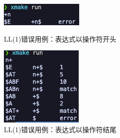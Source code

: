 \begin{figure}[htbp]
    \centering
    \begin{minipage}[t]{0.3\textwidth}
        \centering
        \includegraphics[width=\textwidth]{images/ll_7.png}
        \caption{LL(1)错误用例：表达式以操作符开头}
        \label{fig:ll-7}
    \end{minipage}
    \begin{minipage}[t]{0.3\textwidth}
        \centering
        \includegraphics[width=\textwidth]{images/ll_8.png}
        \caption{LL(1)错误用例：表达式以操作符结尾}
        \label{fig:ll-8}
    \end{minipage}
    \begin{minipage}[t]{0.3\textwidth}
        \centering

\end{minipage}
\end{figure}
